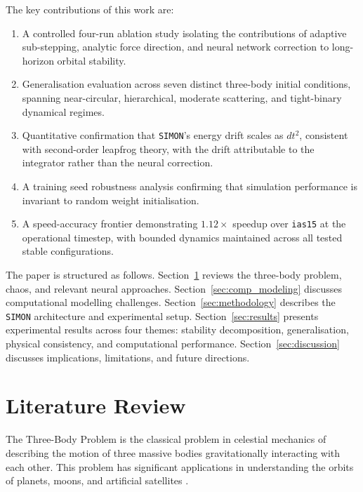 \documentclass[12pt]{article}
\begin{document}
The key contributions of this work are:

\begin{enumerate}
  \item A controlled four-run ablation study isolating the contributions of adaptive
        sub-stepping, analytic force direction, and neural network correction to
        long-horizon orbital stability.
  \item Generalisation evaluation across seven distinct three-body initial conditions,
        spanning near-circular, hierarchical, moderate scattering, and tight-binary
        dynamical regimes.
  \item Quantitative confirmation that \texttt{SIMON}'s energy drift scales as
        $dt^2$, consistent with second-order leapfrog theory, with the drift
        attributable to the integrator rather than the neural correction.
  \item A training seed robustness analysis confirming that simulation performance
        is invariant to random weight initialisation.
  \item A speed-accuracy frontier demonstrating $1.12\times$ speedup over
        \texttt{ias15} at the operational timestep, with bounded dynamics maintained
        across all tested stable configurations.
\end{enumerate}

The paper is structured as follows.
Section~\ref{sec:lit_review} reviews the three-body problem, chaos, and relevant
neural approaches.
Section~\ref{sec:comp_modeling} discusses computational modelling challenges.
Section~\ref{sec:methodology} describes the \texttt{SIMON} architecture and
experimental setup.
Section~\ref{sec:results} presents experimental results across four themes:
stability decomposition, generalisation, physical consistency, and computational
performance.
Section~\ref{sec:discussion} discusses implications, limitations, and future
directions.

\section{Literature Review}
\label{sec:lit_review}

The Three-Body Problem is the classical problem in celestial
mechanics of describing the motion of three massive bodies
gravitationally interacting with each other. This problem has
significant applications in understanding the orbits of planets,
moons, and artificial satellites \citep{gardner2006james}.
\end{document}
